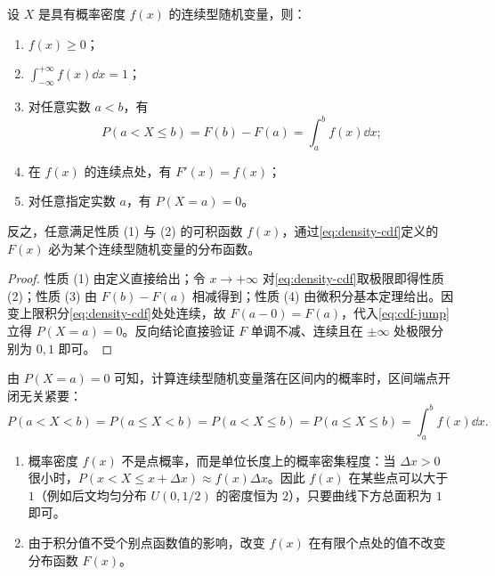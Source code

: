 \begin{proposition}[概率密度的基本性质]
\label{prop:density-properties}
设 $X$ 是具有概率密度 $f(x)$ 的连续型随机变量，则：
\begin{enumerate}
  \item $f(x)\ge 0$；
  \item $\int_{-\infty}^{+\infty}f(x)\dd x=1$；
  \item 对任意实数 $a<b$，有
  \begin{equation}
    P(a<X\le b)=F(b)-F(a)=\int_{a}^{b}f(x)\dd x;
    \label{eq:density-interval}
  \end{equation}
  \item 在 $f(x)$ 的连续点处，有 $F'(x)=f(x)$；
  \item 对任意指定实数 $a$，有 $P(X=a)=0$。
\end{enumerate}
反之，任意满足性质 (1) 与 (2) 的可积函数 $f(x)$，通过\eqref{eq:density-cdf}定义的 $F(x)$ 必为某个连续型随机变量的分布函数。
\end{proposition}
\begin{proof}
性质 (1) 由定义直接给出；令 $x\to+\infty$ 对\eqref{eq:density-cdf}取极限即得性质 (2)；性质 (3) 由 $F(b)-F(a)$ 相减得到；性质 (4) 由微积分基本定理给出。因变上限积分\eqref{eq:density-cdf}处处连续，故 $F(a-0)=F(a)$，代入\eqref{eq:cdf-jump}立得 $P(X=a)=0$。反向结论直接验证 $F$ 单调不减、连续且在 $\pm\infty$ 处极限分别为 $0,1$ 即可。
\end{proof}

由 $P(X=a)=0$ 可知，计算连续型随机变量落在区间内的概率时，区间端点开闭无关紧要：
\[
  P(a<X<b)=P(a\le X<b)=P(a<X\le b)=P(a\le X\le b)=\int_{a}^{b}f(x)\dd x.
\]

\begin{pitfall}[正确理解概率密度]
\begin{enumerate}
  \item 概率密度 $f(x)$ 不是点概率，而是单位长度上的概率密集程度：当 $\Delta x>0$ 很小时，$P(x<X\le x+\Delta x)\approx f(x)\Delta x$。因此 $f(x)$ 在某些点可以大于 $1$（例如后文均匀分布 $U(0,1/2)$ 的密度恒为 $2$），只要曲线下方总面积为 $1$ 即可。
  \item 由于积分值不受个别点函数值的影响，改变 $f(x)$ 在有限个点处的值不改变分布函数 $F(x)$。
\end{enumerate}
\end{pitfall}


